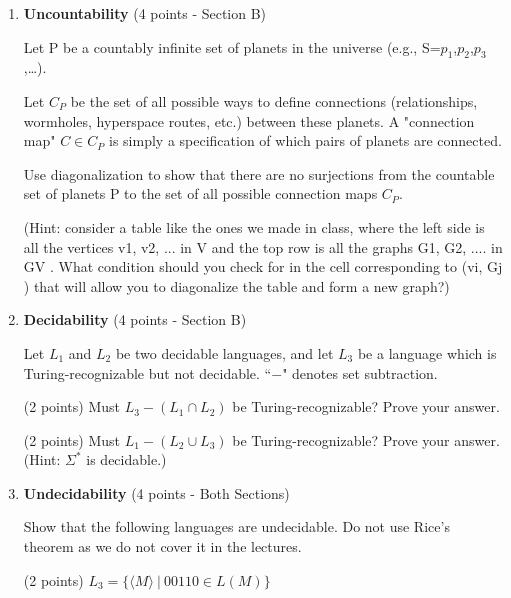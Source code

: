 \documentclass[11pt]{article}
\begin{document}
\begin{enumerate}
\item \textbf{Uncountability} (4 points - Section B)

Let P be a countably infinite set of planets in the universe (e.g., S={$p_1$,$p_2$,$p_3$,…}).

Let $C_P$ be the set of all possible ways to define connections (relationships, wormholes, hyperspace routes, etc.) between these planets. A "connection map" $C \in C_P$ is simply a specification of which pairs of planets are connected.

Use diagonalization to show that there are no surjections from the countable set of planets P to the set of all possible connection maps $C_P$.

(Hint: consider a table like the ones we made in class, where the left side is all the vertices v1, v2, ... in V and the top row is all the graphs G1, G2, .... in GV . What condition should you check for in the cell corresponding to (vi, Gj ) that will allow you to diagonalize the table and form a new graph?)


\begin{answer}
\end{answer}

\item \textbf{Decidability} (4 points - Section B)

Let $L_1$ and $L_2$ be two decidable languages, and let $L_3$ be a language which is Turing-recognizable but not decidable. ``$-$" denotes set subtraction.

(2 points) Must $L_3 - (L_1 \cap L_2)$ be Turing-recognizable? Prove your answer.

\begin{answer}
\end{answer}

(2 points) Must $L_1 - (L_2 \cup L_3)$ be Turing-recognizable? Prove your answer. (Hint: $\Sigma^*$ is decidable.)

\begin{answer}
\end{answer}

\item \textbf{Undecidability} (4 points - Both Sections)
 
 Show that the following languages are undecidable. Do not use Rice's theorem as we do not cover it in the lectures.


 (2 points) $L_3 = \{\langle M \rangle\ |\ 00110 \in L(M)\}$


\end{enumerate}
\end{document}
